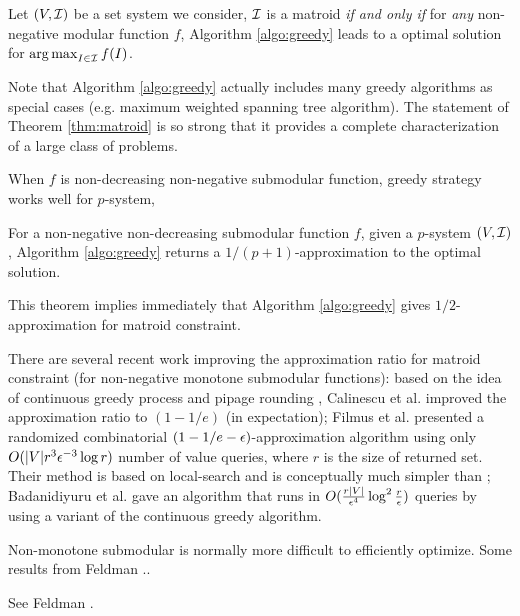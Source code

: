 \begin{theorem}
  \label{thm:matroid}
  Let $(V, \mathcal{I})$ be a set system we consider, $\mathcal{I}$ is a matroid \emph{if and only if} for \emph{any} non-negative modular function $f$, Algorithm \ref{algo:greedy} leads to a optimal solution for $\operatorname*{arg\,max}_{I\in \mathcal{I}} f(I)$.
\end{theorem}
Note that Algorithm \ref{algo:greedy} actually includes many greedy algorithms as special cases (e.g. maximum weighted spanning tree algorithm). The statement of Theorem \ref{thm:matroid} is so strong that it provides a complete  characterization of a large class of problems.

When $f$ is non-decreasing non-negative submodular function, greedy strategy works well for $p$-system,
\begin{theorem}
  \label{thm:}
  For a non-negative non-decreasing submodular function $f$, given a $p$-system $(V, \mathcal{I})$, Algorithm \ref{algo:greedy} returns a $1/(p + 1)$-approximation to the optimal solution.
\end{theorem}
This theorem implies immediately that Algorithm \ref{algo:greedy} gives $1/2$-approximation for matroid constraint. 

There are several recent work improving the approximation ratio for matroid constraint (for non-negative monotone submodular functions): based on the idea of continuous greedy process \cite{V08} and pipage rounding \cite{AS04}, Calinescu et al. \cite{CCP+11} improved the approximation ratio to $(1 - 1/e)$ (in expectation); Filmus et al. \cite{FW14} presented a randomized combinatorial $(1 - 1/e -\epsilon)$-approximation algorithm using only $O(|V|r^3\epsilon^{-3}\log r)$ number of value queries, where $r$ is the size of returned set. Their method is based on local-search and is conceptually much simpler than \cite{CCP+11}; Badanidiyuru et al. \cite{BV14} gave an algorithm that runs in $O(\frac{r|V|}{\epsilon^4}\log^2\frac{r}{\epsilon})$ queries by using a variant of the continuous greedy algorithm.






Non-monotone submodular is normally more difficult to efficiently optimize. Some results from Feldman ..

See Feldman \cite{FNS+11}.













